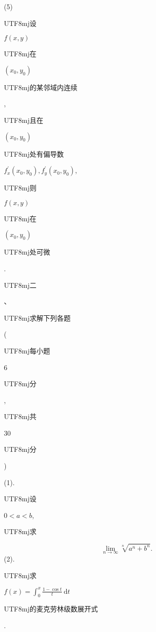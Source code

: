 \documentclass[10pt]{article}
\begin{document}
(5) \begin{CJK}{UTF8}{mj}设\end{CJK} $f(x, y)$ \begin{CJK}{UTF8}{mj}在\end{CJK} $\left(x_{0}, y_{0}\right)$ \begin{CJK}{UTF8}{mj}的某邻域内连续\end{CJK}, \begin{CJK}{UTF8}{mj}且在\end{CJK} $\left(x_{0}, y_{0}\right)$ \begin{CJK}{UTF8}{mj}处有偏导数\end{CJK} $f_{x}^{\prime}\left(x_{0}, y_{0}\right), f_{y}^{\prime}\left(x_{0}, y_{0}\right)$, \begin{CJK}{UTF8}{mj}则\end{CJK} $f(x, y)$ \begin{CJK}{UTF8}{mj}在\end{CJK} $\left(x_{0}, y_{0}\right)$ \begin{CJK}{UTF8}{mj}处可微\end{CJK}.

\begin{CJK}{UTF8}{mj}二\end{CJK}、\begin{CJK}{UTF8}{mj}求解下列各题\end{CJK} (\begin{CJK}{UTF8}{mj}每小题\end{CJK} 6 \begin{CJK}{UTF8}{mj}分\end{CJK}, \begin{CJK}{UTF8}{mj}共\end{CJK} 30 \begin{CJK}{UTF8}{mj}分\end{CJK})

(1). \begin{CJK}{UTF8}{mj}设\end{CJK} $0<a<b$, \begin{CJK}{UTF8}{mj}求\end{CJK}
$$
\lim _{n \rightarrow \infty} \sqrt[n]{a^{n}+b^{n}} .
$$
(2). \begin{CJK}{UTF8}{mj}求\end{CJK} $f(x)=\int_{0}^{x} \frac{1-\cos t}{t} \mathrm{~d} t$ \begin{CJK}{UTF8}{mj}的麦克劳林级数展开式\end{CJK}.
\end{document}
